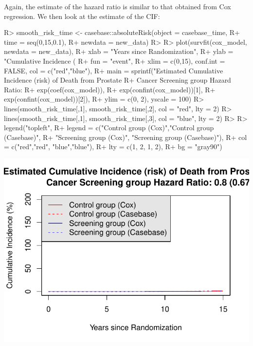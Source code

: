 \documentclass[
]{jss}
\begin{document}
Again, the estimate of the hazard ratio is similar to that obtained from
Cox regression. We then look at the estimate of the CIF:

\begin{CodeChunk}

\begin{CodeInput}
R> smooth_risk_time <- casebase::absoluteRisk(object = casebase_time, 
R+                                           time = seq(0,15,0.1), 
R+                                           newdata = new_data)
R> 
R> plot(survfit(cox_model, newdata = new_data),
R+      xlab = "Years since Randomization", 
R+      ylab = "Cumulative Incidence (%
R+      fun = "event",
R+      xlim = c(0,15), conf.int = FALSE, col = c("red","blue"), 
R+      main = sprintf("Estimated Cumulative Incidence (risk) of Death from Prostate 
R+                     Cancer Screening group Hazard Ratio: %
R+                     exp(coef(cox_model)), 
R+                     exp(confint(cox_model))[1], 
R+                     exp(confint(cox_model))[2]),
R+      ylim = c(0, 2), yscale = 100)
R> lines(smooth_risk_time[,1], smooth_risk_time[,2], col = "red", lty = 2)
R> lines(smooth_risk_time[,1], smooth_risk_time[,3], col = "blue", lty = 2)
R> 
R> legend("topleft", 
R+        legend = c("Control group (Cox)","Control group (Casebase)",
R+                   "Screening group (Cox)", "Screening group (Casebase)"), 
R+        col = c("red","red", "blue","blue"),
R+        lty = c(1, 2, 1, 2), 
R+        bg = "gray90")
\end{CodeInput}


\begin{center}\includegraphics{../figures/erspc-casebase-weibull-cif-1} \end{center}

\end{CodeChunk}
\end{document}
